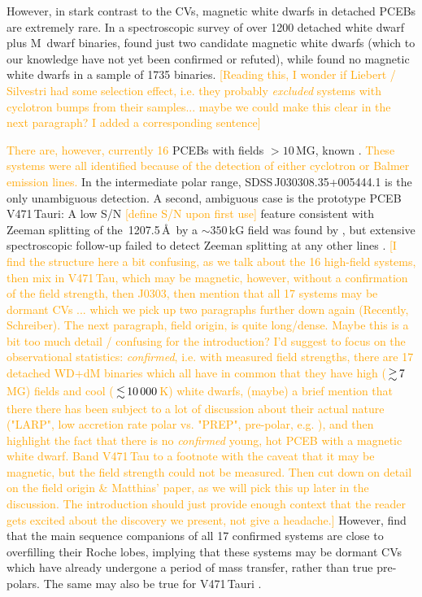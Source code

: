 \documentclass[fleqn,usenatbib]{mnras}
\newcommand{\bgc}[1]{\textcolor{orange}{[#1]}}
\newcommand{\bgs}[1]{\textcolor{orange}{#1}}
\begin{document}
However, in stark contrast to the CVs, magnetic white dwarfs in detached PCEBs are extremely rare. In a spectroscopic survey of over 1200 detached white dwarf plus M~dwarf binaries, \citet{silvestrietal07-1} found just two candidate magnetic white dwarfs (which to our knowledge have not yet been confirmed or refuted), while \citet{liebertetal15-1} found no magnetic white dwarfs in a sample of 1735 binaries. \bgc{Reading this, I wonder if Liebert / Silvestri had some selection effect, i.e. they probably \textit{excluded} systems with cyclotron bumps from their samples... maybe we could make this clear in the next paragraph? I added a corresponding sentence}

\bgs{There are, however, currently 16} PCEBs 
with fields $ > 10$\,MG, known \citep{reimers+hagen00-1, reimersetal99-1, schmidtetal05-1, schmidtetal07-1, schwopeetal09-1, parsonsetal21-1}. \bgs{These systems were all identified because of the detection of either cyclotron or Balmer emission lines.} In the intermediate polar range, SDSS\,J030308.35+005444.1 \citep[$B = 8$\,MG,][]{parsonsetal13-1} is the only unambiguous detection. A second, ambiguous case is the prototype PCEB V471\,Tauri: A low S/N \bgc{define S/N upon first use} feature consistent with Zeeman splitting of the \,1207.5\,\AA\ by a $\sim 350$\,kG field was found by \citet{sionetal98-2}, but extensive spectroscopic follow-up failed to detect Zeeman splitting at any other lines \citep{sionetal12-1}. \bgc{I find the structure here a bit confusing, as we talk about the 16 high-field systems, then mix in V471\,Tau, which may be magnetic, however, without a confirmation of the field strength, then J0303, then mention that all 17 systems may be dormant CVs ... which we pick up two paragraphs further down again (Recently, Schreiber). The next paragraph, field origin, is quite long/dense. Maybe this is a bit too much detail / confusing for the introduction? I'd suggest to focus on the observational statistics: \textit{confirmed}, i.e. with measured field strengths, there are 17 detached WD+dM binaries which all have in common that they have high ($\ga7$\,MG) fields and cool ($\la10\,000$\,K) white dwarfs, (maybe) a brief mention that there there has been subject to a lot of discussion about their actual nature ("LARP", low accretion rate polar vs. "PREP", pre-polar, e.g. \citet{vogeletal07-1}), and then highlight the fact that there is no \textit{confirmed} young, hot PCEB with a magnetic white dwarf. Band V471\,Tau to a footnote with the caveat that it may be magnetic, but the field strength could not be measured. Then cut down on detail on the field origin \& Matthias' paper, as we will pick this up later in the discussion. The introduction should just provide enough context that the reader gets excited about the discovery we present, not give a headache.} However, \citet{parsonsetal21-1} find that the main sequence companions of all 17 confirmed systems are close to overfilling their Roche lobes, implying that these systems may be dormant CVs which have already undergone a period of mass transfer, rather than true pre-polars. The same may also be true for V471\,Tauri \citep{obrienetal01-1, hussainetal06-1}.    
\end{document}
